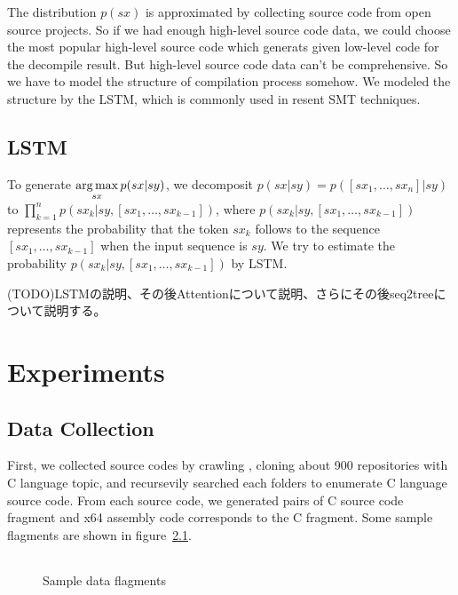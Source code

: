 \documentclass[senior,final,11pt]{iscs-thesis}
\newcommand{\argmax}{\mathop{\rm arg\,max}\limits}
\begin{document}
The distribution $p(sx)$ is approximated by collecting source code from open source projects.
So if we had enough high-level source code data, we could choose the most popular high-level source code which generats given low-level code for the decompile result.
But high-level source code data can't be comprehensive.
So we have to model the structure of compilation process somehow.
We modeled the structure by the LSTM, which is commonly used in resent SMT techniques.

\section{LSTM}
To generate $ \argmax_{sx} p(sx|sy)$, we decomposit $ p(sx|sy) = p([sx_1, \dots, sx_n] |sy) $ to $ \prod_{k=1}^{n} p(sx_k|sy,[sx_1,\dots,sx_{k-1}]) $,
where $ p(sx_k|sy,[sx_1,\dots,sx_{k-1}]) $ represents the probability that the token $ sx_k $ follows to the sequence $ [sx_1,\dots,sx_{k-1}] $ 
when the input sequence is $ sy $. We try to estimate the probability 
$ p(sx_k|sy,[sx_1,\dots,sx_{k-1}]) $ by LSTM.

(TODO)LSTMの説明、その後Attentionについて説明、さらにその後seq2treeについて説明する。

\chapter{Experiments}

\section{Data Collection}
First, we collected source codes by crawling \cite[GitHub]{github}, cloning about 900 repositories with C language topic, 
and recursevily searched each folders to enumerate C language source code.
From each source code, we generated pairs of C source code fragment and x64 assembly code corresponds to the C fragment.
Some sample flagments are shown in figure~\ref{fig:pairsofflagments}. 

\begin{figure}
	\begin{tabular}{cc}
	\end{tabular}
	\caption{Sample data flagments}
	\label{fig:pairsofflagments}
\end{figure}
\end{document}

